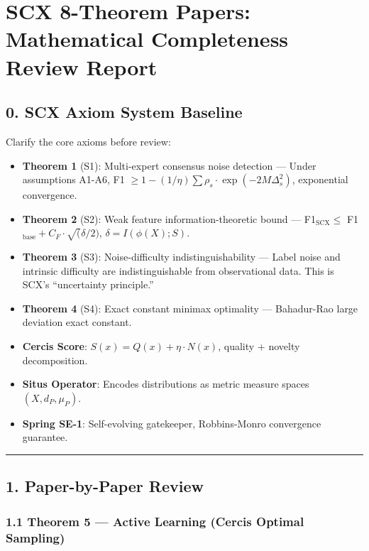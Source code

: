 \documentclass[
  12pt,
]{article}
\author{SCX}
\date{2026}
\providecommand{\tightlist}{%
  \setlength{\itemsep}{0pt}\setlength{\parskip}{0pt}}
\begin{document}
\section{SCX 8-Theorem Papers: Mathematical Completeness Review Report}\label{scx-8-theorem-papers-mathematical-completeness-review-report}

\subsection{0. SCX Axiom System Baseline}\label{scx-axiom-system-baseline}

Clarify the core axioms before review:

\begin{itemize}
\tightlist
\item
  \textbf{Theorem 1} (S1): Multi-expert consensus noise detection --- Under assumptions A1-A6, F1 $\geq 1 - (1/\eta)\sum\rho_s\cdot\exp(-2M\Delta_s^2)$, exponential convergence.
\item
  \textbf{Theorem 2} (S2): Weak feature information-theoretic bound --- F1$_{\text{SCX}} \leq$ F1$_{\text{base}} + C_F\cdot\sqrt(\delta/2)$, $\delta=I(\phi(X);S)$.
\item
  \textbf{Theorem 3} (S3): Noise-difficulty indistinguishability --- Label noise and intrinsic difficulty are indistinguishable from observational data. This is SCX's ``uncertainty principle.''
\item
  \textbf{Theorem 4} (S4): Exact constant minimax optimality --- Bahadur-Rao large deviation exact constant.
\item
  \textbf{Cercis Score}: $S(x) = Q(x) + \eta\cdot N(x)$, quality + novelty decomposition.
\item
  \textbf{Situs Operator}: Encodes distributions as metric measure spaces $(X, d_P, \mu_P)$.
\item
  \textbf{Spring SE-1}: Self-evolving gatekeeper, Robbins-Monro convergence guarantee.
\end{itemize}

\begin{center}\rule{0.5\linewidth}{0.5pt}\end{center}

\subsection{1. Paper-by-Paper Review}\label{paper-by-paper-review}

\subsubsection{1.1 Theorem 5 --- Active Learning (Cercis Optimal Sampling)}\label{theorem-5-active-learning-cercis-optimal-sampling}
\end{document}
